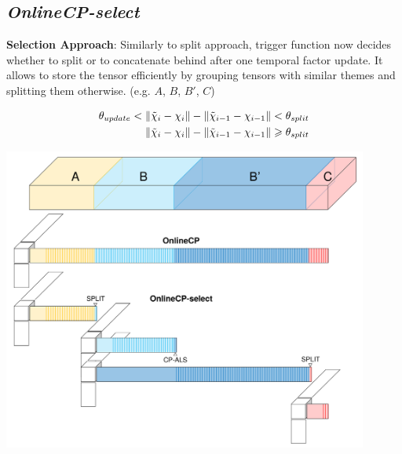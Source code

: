 \newpage
\subsection{\em OnlineCP-select}
\textbf{Selection Approach}: Similarly to split approach, trigger function now decides whether to split or to concatenate behind after one temporal factor update. It allows to store the tensor efficiently by grouping tensors with similar themes and splitting them otherwise. (e.g. $A$, $B$, $B'$, $C$)

\begin{align*}
    {\theta}_{update} < \left\lVert\tilde{\chi}_{i}-\chi_{i}\right\rVert-\left\lVert\tilde{\chi}_{i-1}-\chi_{i-1}\right\rVert <{\theta}_{split} \\
    \left\lVert\tilde{\chi}_{i}-\chi_{i}\right\rVert-\left\lVert\tilde{\chi}_{i-1}-\chi_{i-1}\right\rVert \geqslant {\theta}_{split}
\end{align*}

\begin{center}
	\includegraphics[width=0.9\textwidth]{FIG/OnlineCP-select.png}
\end{center}
